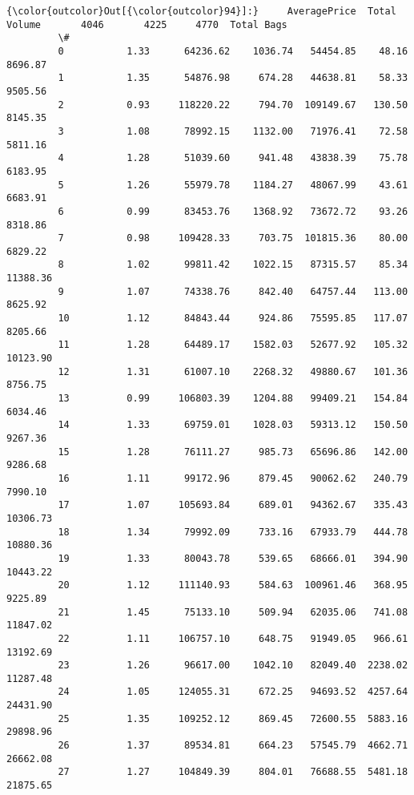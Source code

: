 \documentclass[11pt]{article}
\begin{document}
\begin{Verbatim}[commandchars=\\\{\}]
{\color{outcolor}Out[{\color{outcolor}94}]:}     AveragePrice  Total Volume       4046       4225     4770  Total Bags
         \#                                                                        
         0           1.33      64236.62    1036.74   54454.85    48.16     8696.87
         1           1.35      54876.98     674.28   44638.81    58.33     9505.56
         2           0.93     118220.22     794.70  109149.67   130.50     8145.35
         3           1.08      78992.15    1132.00   71976.41    72.58     5811.16
         4           1.28      51039.60     941.48   43838.39    75.78     6183.95
         5           1.26      55979.78    1184.27   48067.99    43.61     6683.91
         6           0.99      83453.76    1368.92   73672.72    93.26     8318.86
         7           0.98     109428.33     703.75  101815.36    80.00     6829.22
         8           1.02      99811.42    1022.15   87315.57    85.34    11388.36
         9           1.07      74338.76     842.40   64757.44   113.00     8625.92
         10          1.12      84843.44     924.86   75595.85   117.07     8205.66
         11          1.28      64489.17    1582.03   52677.92   105.32    10123.90
         12          1.31      61007.10    2268.32   49880.67   101.36     8756.75
         13          0.99     106803.39    1204.88   99409.21   154.84     6034.46
         14          1.33      69759.01    1028.03   59313.12   150.50     9267.36
         15          1.28      76111.27     985.73   65696.86   142.00     9286.68
         16          1.11      99172.96     879.45   90062.62   240.79     7990.10
         17          1.07     105693.84     689.01   94362.67   335.43    10306.73
         18          1.34      79992.09     733.16   67933.79   444.78    10880.36
         19          1.33      80043.78     539.65   68666.01   394.90    10443.22
         20          1.12     111140.93     584.63  100961.46   368.95     9225.89
         21          1.45      75133.10     509.94   62035.06   741.08    11847.02
         22          1.11     106757.10     648.75   91949.05   966.61    13192.69
         23          1.26      96617.00    1042.10   82049.40  2238.02    11287.48
         24          1.05     124055.31     672.25   94693.52  4257.64    24431.90
         25          1.35     109252.12     869.45   72600.55  5883.16    29898.96
         26          1.37      89534.81     664.23   57545.79  4662.71    26662.08
         27          1.27     104849.39     804.01   76688.55  5481.18    21875.65

\end{Verbatim}
\end{document}
